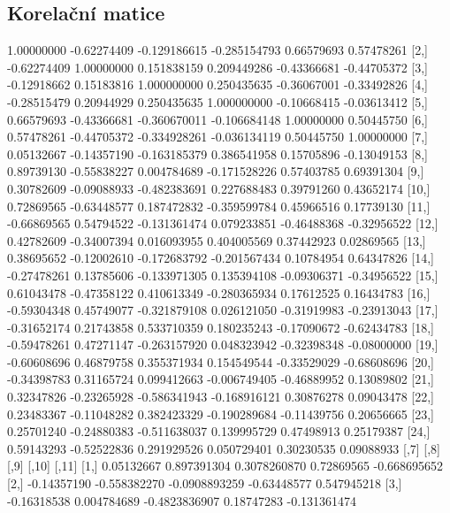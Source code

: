 \documentclass[a4paper, 12pt]{article}
\begin{document}
\subsection{Korelační matice}
\begin{table}[H]
\footnotesize
\begin{Schunk}
\begin{Soutput}
             [,1]        [,2]         [,3]         [,4]        [,5]        [,6]
 [1,]  1.00000000 -0.62274409 -0.129186615 -0.285154793  0.66579693  0.57478261
 [2,] -0.62274409  1.00000000  0.151838159  0.209449286 -0.43366681 -0.44705372
 [3,] -0.12918662  0.15183816  1.000000000  0.250435635 -0.36067001 -0.33492826
 [4,] -0.28515479  0.20944929  0.250435635  1.000000000 -0.10668415 -0.03613412
 [5,]  0.66579693 -0.43366681 -0.360670011 -0.106684148  1.00000000  0.50445750
 [6,]  0.57478261 -0.44705372 -0.334928261 -0.036134119  0.50445750  1.00000000
 [7,]  0.05132667 -0.14357190 -0.163185379  0.386541958  0.15705896 -0.13049153
 [8,]  0.89739130 -0.55838227  0.004784689 -0.171528226  0.57403785  0.69391304
 [9,]  0.30782609 -0.09088933 -0.482383691  0.227688483  0.39791260  0.43652174
[10,]  0.72869565 -0.63448577  0.187472832 -0.359599784  0.45966516  0.17739130
[11,] -0.66869565  0.54794522 -0.131361474  0.079233851 -0.46488368 -0.32956522
[12,]  0.42782609 -0.34007394  0.016093955  0.404005569  0.37442923  0.02869565
[13,]  0.38695652 -0.12002610 -0.172683792 -0.201567434  0.10784954  0.64347826
[14,] -0.27478261  0.13785606 -0.133971305  0.135394108 -0.09306371 -0.34956522
[15,]  0.61043478 -0.47358122  0.410613349 -0.280365934  0.17612525  0.16434783
[16,] -0.59304348  0.45749077 -0.321879108  0.026121050 -0.31919983 -0.23913043
[17,] -0.31652174  0.21743858  0.533710359  0.180235243 -0.17090672 -0.62434783
[18,] -0.59478261  0.47271147 -0.263157920  0.048323942 -0.32398348 -0.08000000
[19,] -0.60608696  0.46879758  0.355371934  0.154549544 -0.33529029 -0.68608696
[20,] -0.34398783  0.31165724  0.099412663 -0.006749405 -0.46889952  0.13089802
[21,]  0.32347826 -0.23265928 -0.586341943 -0.168916121  0.30876278  0.09043478
[22,]  0.23483367 -0.11048282  0.382423329 -0.190289684 -0.11439756  0.20656665
[23,]  0.25701240 -0.24880383 -0.511638037  0.139995729  0.47498913  0.25179387
[24,]  0.59143293 -0.52522836  0.291929526  0.050729401  0.30230535  0.09088933
             [,7]         [,8]          [,9]       [,10]        [,11]
 [1,]  0.05132667  0.897391304  0.3078260870  0.72869565 -0.668695652
 [2,] -0.14357190 -0.558382270 -0.0908893259 -0.63448577  0.547945218
 [3,] -0.16318538  0.004784689 -0.4823836907  0.18747283 -0.131361474

\end{Soutput}
\end{Schunk}
\end{table}
\end{document}
